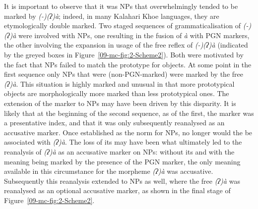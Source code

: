 \documentclass[output=paper]{LSP/langsci}
\begin{document}
It is important to observe that it was  NPs that overwhelmingly tended to be marked by \textit{(-)(ʔ)à}; indeed, in many Kalahari Khoe languages, they are etymologically double marked. Two staged sequences of grammaticalisation of \textit{(-)(ʔ)à} were involved with  NPs, one resulting in the fusion of \textit{à} with PGN markers, the other involving the expansion in usage of the free reflex of \textit{(-)(ʔ)à} (indicated by the greyed boxes in Figure~\ref{09-mc-fig:2-Scheme2}). Both were motivated by the fact that  NPs failed to match the prototype for objects. At some point in the first sequence only  NPs that were  (\ie non-PGN-marked) were marked by the free \textit{(ʔ)à}. This situation is highly marked and unusual in that more prototypical objects are morphologically more marked than less prototypical ones. The extension of the marker to   NPs may have been driven by this disparity. It is likely that at the beginning of the second sequence, as of the first, the marker was a presentative index, and that it was only subsequently reanalysed as an accusative marker. Once established as the norm for  NPs, no longer would the  be associated with \textit{(ʔ)à}. The loss of its  may have been what ultimately led to the reanalysis of \textit{(ʔ)à} as an accusative marker on  NPs: without its  and with the  meaning being marked by the presence of the PGN marker, the only meaning available in this circumstance for the morpheme \textit{(ʔ)à} was accusative. Subsequently this reanalysis extended to  NPs as well, where the free \textit{(ʔ)à} was reanalysed as an optional accusative marker, as shown in the final stage of Figure~\ref{09-mc-fig:2-Scheme2}.
\end{document}

